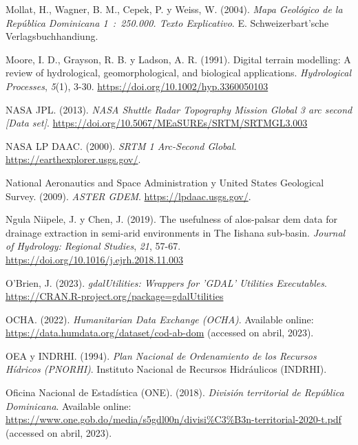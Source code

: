 \documentclass[spanish]{article}
\newlength{\cslhangindent}
\newlength{\cslentryspacingunit} %
\newenvironment{CSLReferences}[2] %
 {%
  \setlength{\parindent}{0pt}
  \ifodd #1
  \let\oldpar\par
  \def\par{\hangindent=\cslhangindent\oldpar}
  \fi
  \setlength{\parskip}{#2\cslentryspacingunit}
 }%
 {}
\begin{document}
\begin{CSLReferences}{1}{0}
\leavevmode{}%
Mollat, H., Wagner, B. M., Cepek, P. y Weiss, W. (2004). \emph{{Mapa
Geol{ó}gico de la Rep{ú}blica Dominicana 1~:~250.000. Texto
Explicativo}}. E. Schweizerbart'sche Verlagsbuchhandiung.

\leavevmode{}%
Moore, I. D., Grayson, R. B. y Ladson, A. R. (1991). Digital terrain
modelling: A review of hydrological, geomorphological, and biological
applications. \emph{Hydrological Processes}, \emph{5}(1), 3-30.
\url{https://doi.org/10.1002/hyp.3360050103}

\leavevmode{}%
NASA JPL. (2013). \emph{NASA Shuttle Radar Topography Mission Global 3
arc second {[}Data set{]}}.
\url{https://doi.org/10.5067/MEaSUREs/SRTM/SRTMGL3.003}

\leavevmode{}%
NASA LP DAAC. (2000). \emph{SRTM 1 Arc-Second Global}.
\url{https://earthexplorer.usgs.gov/}.

\leavevmode{}%
National Aeronautics and Space Administration y United States Geological
Survey. (2009). \emph{{ASTER GDEM}}. \url{https://lpdaac.usgs.gov/}.

\leavevmode{}%
Ngula Niipele, J. y Chen, J. (2019). {The usefulness of alos-palsar dem
data for drainage extraction in semi-arid environments in The Iishana
sub-basin}. \emph{Journal of Hydrology: Regional Studies}, \emph{21},
57-67. \url{https://doi.org/10.1016/j.ejrh.2018.11.003}

\leavevmode{}%
O'Brien, J. (2023). \emph{gdalUtilities: Wrappers for 'GDAL' Utilities
Executables}. \url{https://CRAN.R-project.org/package=gdalUtilities}

\leavevmode{}%
OCHA. (2022). \emph{{Humanitarian Data Exchange (OCHA)}}. Available
online: \url{https://data.humdata.org/dataset/cod-ab-dom} (accessed on
abril, 2023).

\leavevmode{}%
OEA y INDRHI. (1994). \emph{{Plan Nacional de Ordenamiento de los
Recursos Hídricos (PNORHI)}}. {Instituto Nacional de Recursos
Hidráulicos (INDRHI)}.

\leavevmode{}%
Oficina Nacional de Estadística (ONE). (2018). \emph{{División
territorial de República Dominicana}}. Available online:
\url{https://www.one.gob.do/media/s5gdl00n/divisi\%C3\%B3n-territorial-2020-t.pdf}
(accessed on abril, 2023).


\end{CSLReferences}
\end{document}
